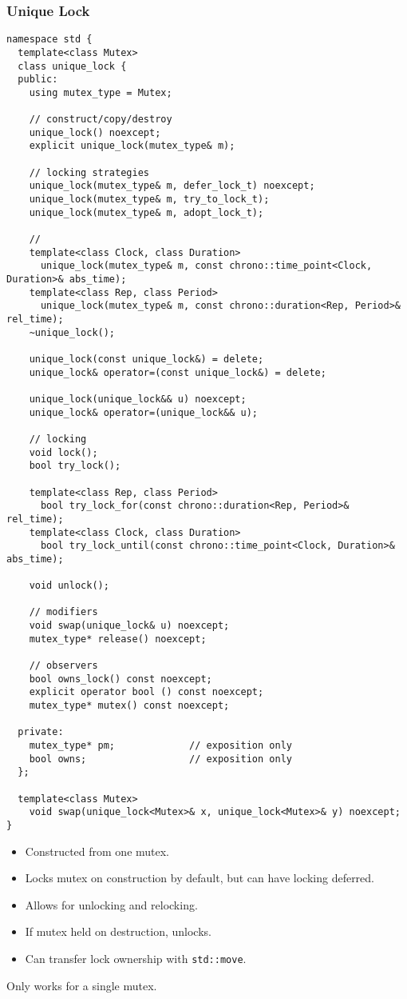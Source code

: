 \subsubsection{Unique Lock}
\begin{verbatim}
namespace std {
  template<class Mutex>
  class unique_lock {
  public:
    using mutex_type = Mutex;
  
    // construct/copy/destroy
    unique_lock() noexcept;
    explicit unique_lock(mutex_type& m);

    // locking strategies
    unique_lock(mutex_type& m, defer_lock_t) noexcept;
    unique_lock(mutex_type& m, try_to_lock_t);
    unique_lock(mutex_type& m, adopt_lock_t);

    //
    template<class Clock, class Duration>
      unique_lock(mutex_type& m, const chrono::time_point<Clock, Duration>& abs_time);
    template<class Rep, class Period>
      unique_lock(mutex_type& m, const chrono::duration<Rep, Period>& rel_time);
    ~unique_lock();
  
    unique_lock(const unique_lock&) = delete;
    unique_lock& operator=(const unique_lock&) = delete;
  
    unique_lock(unique_lock&& u) noexcept;
    unique_lock& operator=(unique_lock&& u);
  
    // locking
    void lock();
    bool try_lock();
  
    template<class Rep, class Period>
      bool try_lock_for(const chrono::duration<Rep, Period>& rel_time);
    template<class Clock, class Duration>
      bool try_lock_until(const chrono::time_point<Clock, Duration>& abs_time);
  
    void unlock();
  
    // modifiers
    void swap(unique_lock& u) noexcept;
    mutex_type* release() noexcept;
  
    // observers
    bool owns_lock() const noexcept;
    explicit operator bool () const noexcept;
    mutex_type* mutex() const noexcept;
  
  private:
    mutex_type* pm;             // exposition only
    bool owns;                  // exposition only
  };
  
  template<class Mutex>
    void swap(unique_lock<Mutex>& x, unique_lock<Mutex>& y) noexcept;
}
\end{verbatim}
\begin{itemize}
	\item Constructed from one mutex.
	\item Locks mutex on construction by default, but can have locking deferred.
	\item Allows for unlocking and relocking.
	\item If mutex held on destruction, unlocks.
	\item Can transfer lock ownership with \texttt{std::move}.
\end{itemize}
\begin{consbox}
	Only works for a single mutex.
\end{consbox}

